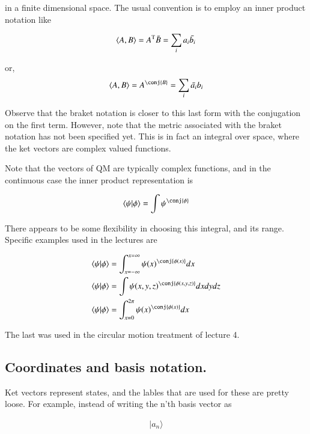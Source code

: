\documentclass{article}
\newcommand{\ket}[1]{\lvert {#1} \rangle}
\newcommand{\braket}[2]{\langle{#1} \vert {#2}\rangle}
\begin{document}
in a finite dimensional space.  The usual convention is to employ an inner product notation like

\begin{align*}
\langle{A}, {B}\rangle = {A}^\text{T} \bar{B} = \sum_i {a_i} \bar{b_i}
\end{align*}

or,
\begin{align*}
\innerprod{A}{B} = {A}^\conj {B} = \sum_i \bar{a_i} {b_i}
\end{align*}

Observe that the braket notation is closer to this last form with the conjugation on the first term.  However, note that the metric associated with the braket notation has not been specified yet.  This is in fact an integral over space, where the ket vectors are complex valued functions.

Note that the vectors of QM are typically complex functions, and in the continuous case the inner product representation is

\begin{align*}
\braket{\psi}{\phi} = \int {\psi}^\conj {\phi}
\end{align*}

There appears to be some flexibility in choosing this integral, and its range.  Specific examples used in the lectures are

\begin{align*}
\braket{\psi}{\phi} &= \int_{x=-\infty}^{x=\infty} {\psi(x)}^\conj {\phi(x)} dx \\
\braket{\psi}{\phi} &= \int {\psi(x,y,z)}^\conj {\phi(x,y,z)} dx dy dz \\
\braket{\psi}{\phi} &= \int_{x=0}^{2\pi} {\psi(x)}^\conj {\phi(x)} dx \\
\end{align*}

The last was used in the circular motion treatment of lecture 4. 

\subsection{ Coordinates and basis notation. }

Ket vectors represent states, and the lables that are used for these are pretty loose.  For example, instead
of writing the n'th basis vector as 

\begin{align*}
\ket{a_n}
\end{align*}
\end{document}
